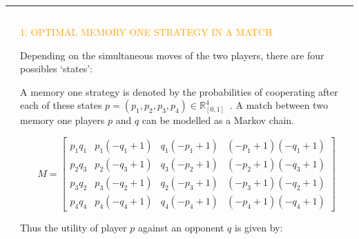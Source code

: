\documentclass[usenames,dvipsnames,t]{beamer}
\newcommand{\R}{\mathbb{R}}
\begin{document}
\hrule height 5pt
\begin{columns}
    \begin{column}{.05\linewidth}
    \end{column}
    \begin{column}{.4\linewidth}
        \vspace{0.9cm}

        \begin{center}
        \textcolor{orange}{\large{1. OPTIMAL MEMORY ONE STRATEGY IN A MATCH}}
        \end{center}
        \vspace{0.3cm}

        \small{
        Depending on the simultaneous moves of the two players, there are four
        possibles `states':}

        \begin{center}
            
        \end{center}

        \small{
        A memory one strategy is denoted by the probabilities of cooperating after each of these states \(p = (p_1, p_2, p_3, p_4) \in \R_{[0,1]} ^ 4\)~\cite{Nowak1990}.
        A match between two memory one players \(p\) and \(q\) can be modelled as
        a Markov chain.}

        \begin{equation*}
        M = \left[\begin{matrix}p_{1} q_{1} & p_{1} \left(- q_{1} + 1\right) & q_{1} \left(- p_{1} + 1\right) & \left(- p_{1} + 1\right) \left(- q_{1} + 1\right)\\
        p_{2} q_{3} & p_{2} \left(- q_{3} + 1\right) & q_{3} \left(- p_{2} + 1\right) & \left(- p_{2} + 1\right) \left(- q_{3} + 1\right)\\
        p_{3} q_{2} & p_{3} \left(- q_{2} + 1\right) & q_{2} \left(- p_{3} + 1\right) & \left(- p_{3} + 1\right) \left(- q_{2} + 1\right)\\
        p_{4} q_{4} & p_{4} \left(- q_{4} + 1\right) & q_{4} \left(- p_{4} + 1\right) & \left(- p_{4} + 1\right) \left(- q_{4} + 1\right)\end{matrix}\right]
        \end{equation*}
        \vspace{0.3cm}

        Thus the utility of player \(p\) against an opponent \(q\) is given by:


\end{column}
\end{columns}
\end{document}
